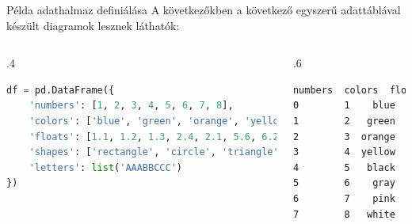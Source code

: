 \documentclass[english, aspectratio=169]{beamer}
\begin{document}
\begin{frame}[fragile]{Példa adathalmaz definiálása}
	A következőkben a következő egyszerű adattáblával készült diagramok lesznek láthatók:
	\begin{columns}
		\begin{column}{.4\textwidth}
			\begin{lstlisting}[language=python]
df = pd.DataFrame({
	'numbers': [1, 2, 3, 4, 5, 6, 7, 8],
	'colors': ['blue', 'green', 'orange', 'yellow', 'black', 'gray', 'pink', 'white'],
	'floats': [1.1, 1.2, 1.3, 2.4, 2.1, 5.6, 6.2, 5.3],
	'shapes': ['rectangle', 'circle', 'triangle', 'rectangle', 'circle', 'triangle', 'rectangle', 'circle'],
	'letters': list('AAABBCCC')
})
			\end{lstlisting}
		\end{column}
		\begin{column}{.6\textwidth}
			\begin{lstlisting}[language=bash]
   numbers  colors  floats     shapes letters
0        1    blue     1.1  rectangle       A
1        2   green     1.2     circle       A
2        3  orange     1.3   triangle       A
3        4  yellow     2.4  rectangle       B
4        5   black     2.1     circle       B
5        6    gray     5.6   triangle       C
6        7    pink     6.2  rectangle       C
7        8   white     5.3     circle       C
			\end{lstlisting}
		\end{column}
	\end{columns}
\end{frame}
\end{document}
